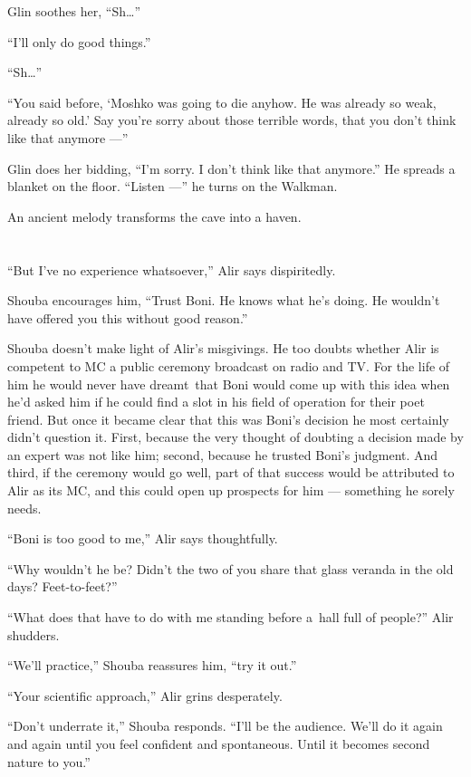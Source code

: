 \documentclass[twoside,11pt,openany]{book}
\begin{document}
Glin soothes her, ``Sh{\ldots}''

``I'll only do good things.''

``Sh{\ldots}''

``You said before, `Moshko was going to die anyhow. He was already so weak, already so old.' Say you're
sorry about those terrible words, that you don't think like that anymore ---''

Glin does her bidding, ``I'm sorry. I don't think like that anymore.'' He spreads a blanket on
the floor. ``Listen ---'' he turns on the Walkman.

An ancient melody transforms the cave into a haven.


\bigskip

\chapter{}

``But I've no experience whatsoever,'' Alir says dispiritedly.

Shouba encourages him, ``Trust Boni. He knows what he's doing. He wouldn't have offered you this without
good reason.''

Shouba doesn't make light of Alir's misgivings. He too doubts whether Alir is competent to MC a public ceremony
broadcast on radio and TV. For the life of him he would never have dreamt~that Boni would come up with this idea when
he'd asked him if he could find a slot in his field of operation for their poet friend. But once it became clear that
this was Boni's decision he most certainly didn't question it. First, because the very thought of doubting a decision
made by an expert was not like him; second, because he trusted Boni's judgment. And third, if the ceremony would go
well, part of that success would be attributed to Alir as its MC, and this could open up prospects for him --- something
he sorely needs.

``Boni is too good to me,'' Alir says thoughtfully.

``Why wouldn't he be? Didn't the two of you share that glass veranda in the old days?
Feet-to-feet?''

``What does that have to do with me standing before a~hall full of people?'' Alir shudders.

``We'll practice,'' Shouba reassures him, ``try it out.''

``Your scientific approach,'' Alir grins desperately.

``Don't underrate it,'' Shouba responds. ``I'll be the audience. We'll do it
again and again until you feel confident and spontaneous. Until it becomes second nature to you.''
\end{document}
